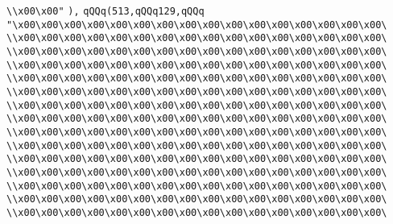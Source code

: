 \verb|\\x00\x00"|\newline
\verb|),|\newline
\verb|qQQq(513,qQQq129,qQQq|\newline
\verb|"\x00\x00\x00\x00\x00\x00\x00\x00\x00\x00\x00\x00\x00\x00\x00\x00\|\newline
\verb|\\x00\x00\x00\x00\x00\x00\x00\x00\x00\x00\x00\x00\x00\x00\x00\x00\|\newline
\verb|\\x00\x00\x00\x00\x00\x00\x00\x00\x00\x00\x00\x00\x00\x00\x00\x00\|\newline
\verb|\\x00\x00\x00\x00\x00\x00\x00\x00\x00\x00\x00\x00\x00\x00\x00\x00\|\newline
\verb|\\x00\x00\x00\x00\x00\x00\x00\x00\x00\x00\x00\x00\x00\x00\x00\x00\|\newline
\verb|\\x00\x00\x00\x00\x00\x00\x00\x00\x00\x00\x00\x00\x00\x00\x00\x00\|\newline
\verb|\\x00\x00\x00\x00\x00\x00\x00\x00\x00\x00\x00\x00\x00\x00\x00\x00\|\newline
\verb|\\x00\x00\x00\x00\x00\x00\x00\x00\x00\x00\x00\x00\x00\x00\x00\x00\|\newline
\verb|\\x00\x00\x00\x00\x00\x00\x00\x00\x00\x00\x00\x00\x00\x00\x00\x00\|\newline
\verb|\\x00\x00\x00\x00\x00\x00\x00\x00\x00\x00\x00\x00\x00\x00\x00\x00\|\newline
\verb|\\x00\x00\x00\x00\x00\x00\x00\x00\x00\x00\x00\x00\x00\x00\x00\x00\|\newline
\verb|\\x00\x00\x00\x00\x00\x00\x00\x00\x00\x00\x00\x00\x00\x00\x00\x00\|\newline
\verb|\\x00\x00\x00\x00\x00\x00\x00\x00\x00\x00\x00\x00\x00\x00\x00\x00\|\newline
\verb|\\x00\x00\x00\x00\x00\x00\x00\x00\x00\x00\x00\x00\x00\x00\x00\x00\|\newline
\verb|\\x00\x00\x00\x00\x00\x00\x00\x00\x00\x00\x00\x00\x00\x00\x00\x00\|\newline

